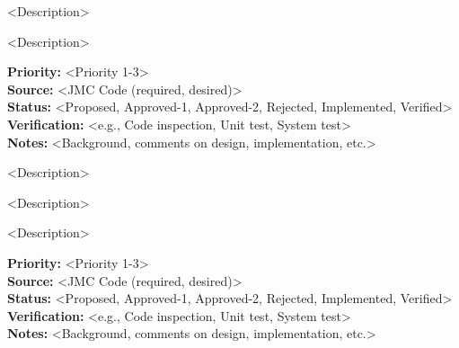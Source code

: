 %


<Description>


<Description>

\begin{reqlist}
{\bf Priority:} <Priority 1-3> \\
{\bf Source:} <JMC Code (required, desired)> \\
{\bf Status:} <Proposed, Approved-1, Approved-2, Rejected, Implemented, Verified> \\
{\bf Verification:} <e.g., Code inspection, Unit test, System test> \\
{\bf Notes:} <Background, comments on design, implementation, etc.> 
\end{reqlist}


<Description>


<Description>


<Description>

\begin{reqlist}
{\bf Priority:} <Priority 1-3> \\
{\bf Source:} <JMC Code (required, desired)> \\
{\bf Status:} <Proposed, Approved-1, Approved-2, Rejected, Implemented, Verified> \\
{\bf Verification:} <e.g., Code inspection, Unit test, System test> \\
{\bf Notes:} <Background, comments on design, implementation, etc.> 
\end{reqlist}









